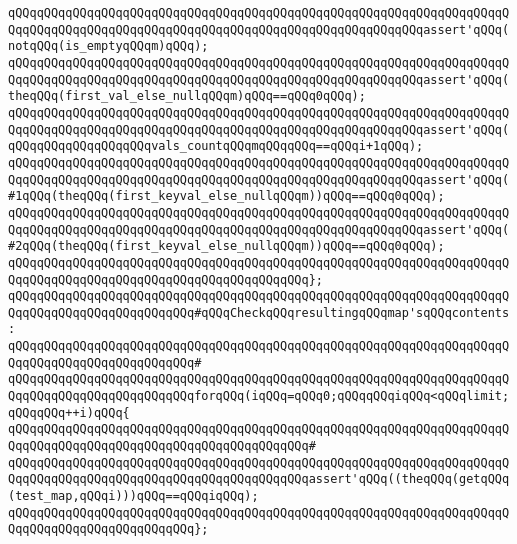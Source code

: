 \verb|qQQqqQQqqQQqqQQqqQQqqQQqqQQqqQQqqQQqqQQqqQQqqQQqqQQqqQQqqQQqqQQqqQQqqQQqqQQqqQQqqQQqqQQqqQQqqQQqqQQqqQQqqQQqqQQqqQQqqQQqqQQqqQQqassert'qQQq(notqQQq(is_emptyqQQqm)qQQq);|\newline
\verb|qQQqqQQqqQQqqQQqqQQqqQQqqQQqqQQqqQQqqQQqqQQqqQQqqQQqqQQqqQQqqQQqqQQqqQQqqQQqqQQqqQQqqQQqqQQqqQQqqQQqqQQqqQQqqQQqqQQqqQQqqQQqqQQqassert'qQQq(theqQQq(first_val_else_nullqQQqm)qQQq==qQQq0qQQq);|\newline
\verb|qQQqqQQqqQQqqQQqqQQqqQQqqQQqqQQqqQQqqQQqqQQqqQQqqQQqqQQqqQQqqQQqqQQqqQQqqQQqqQQqqQQqqQQqqQQqqQQqqQQqqQQqqQQqqQQqqQQqqQQqqQQqqQQqassert'qQQq(qQQqqQQqqQQqqQQqqQQqvals_countqQQqmqQQqqQQq==qQQqi+1qQQq);|\newline
\newline
\verb|qQQqqQQqqQQqqQQqqQQqqQQqqQQqqQQqqQQqqQQqqQQqqQQqqQQqqQQqqQQqqQQqqQQqqQQqqQQqqQQqqQQqqQQqqQQqqQQqqQQqqQQqqQQqqQQqqQQqqQQqqQQqqQQqassert'qQQq(#1qQQq(theqQQq(first_keyval_else_nullqQQqm))qQQq==qQQq0qQQq);|\newline
\verb|qQQqqQQqqQQqqQQqqQQqqQQqqQQqqQQqqQQqqQQqqQQqqQQqqQQqqQQqqQQqqQQqqQQqqQQqqQQqqQQqqQQqqQQqqQQqqQQqqQQqqQQqqQQqqQQqqQQqqQQqqQQqqQQqassert'qQQq(#2qQQq(theqQQq(first_keyval_else_nullqQQqm))qQQq==qQQq0qQQq);|\newline
\newline
\verb|qQQqqQQqqQQqqQQqqQQqqQQqqQQqqQQqqQQqqQQqqQQqqQQqqQQqqQQqqQQqqQQqqQQqqQQqqQQqqQQqqQQqqQQqqQQqqQQqqQQqqQQqqQQqqQQq};|\newline
\newline
\verb|qQQqqQQqqQQqqQQqqQQqqQQqqQQqqQQqqQQqqQQqqQQqqQQqqQQqqQQqqQQqqQQqqQQqqQQqqQQqqQQqqQQqqQQqqQQqqQQq#qQQqCheckqQQqresultingqQQqmap'sqQQqcontents:|\newline
\verb|qQQqqQQqqQQqqQQqqQQqqQQqqQQqqQQqqQQqqQQqqQQqqQQqqQQqqQQqqQQqqQQqqQQqqQQqqQQqqQQqqQQqqQQqqQQqqQQq#|\newline
\verb|qQQqqQQqqQQqqQQqqQQqqQQqqQQqqQQqqQQqqQQqqQQqqQQqqQQqqQQqqQQqqQQqqQQqqQQqqQQqqQQqqQQqqQQqqQQqqQQqforqQQq(iqQQq=qQQq0;qQQqqQQqiqQQq<qQQqlimit;qQQqqQQq++i)qQQq{|\newline
\verb|qQQqqQQqqQQqqQQqqQQqqQQqqQQqqQQqqQQqqQQqqQQqqQQqqQQqqQQqqQQqqQQqqQQqqQQqqQQqqQQqqQQqqQQqqQQqqQQqqQQqqQQqqQQqqQQq#|\newline
\verb|qQQqqQQqqQQqqQQqqQQqqQQqqQQqqQQqqQQqqQQqqQQqqQQqqQQqqQQqqQQqqQQqqQQqqQQqqQQqqQQqqQQqqQQqqQQqqQQqqQQqqQQqqQQqqQQqassert'qQQq((theqQQq(getqQQq(test_map,qQQqi)))qQQq==qQQqiqQQq);|\newline
\verb|qQQqqQQqqQQqqQQqqQQqqQQqqQQqqQQqqQQqqQQqqQQqqQQqqQQqqQQqqQQqqQQqqQQqqQQqqQQqqQQqqQQqqQQqqQQqqQQq};|\newline
